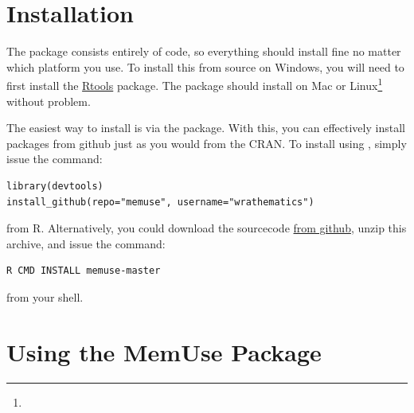 \section{Installation}

The package consists entirely of  code, so everything should install fine no matter which platform you use.  To install this from source on Windows, you will need to first install the \href{http://cran.r-project.org/bin/windows/Rtools/Rtools216.exe}{Rtools} package.  The package should install on Mac or Linux\footnote{\interject} without problem.

The easiest way to install  is via the \href{http://cran.r-project.org/web/packages/devtools/index.html}{} package.  With this, you can effectively install packages from github just as you would from the CRAN.  To install  using , simply issue the command:
\begin{lstlisting}[language=rr]
library(devtools)
install_github(repo="memuse", username="wrathematics")
\end{lstlisting}
from R.  Alternatively, you could download the sourcecode \href{https://github.com/wrathematics/memuse/archive/master.zip}{from github}, unzip this archive, and issue the command:
\begin{lstlisting}[language=sh]
R CMD INSTALL memuse-master
\end{lstlisting}
from your shell.




\section{Using the MemUse Package}

